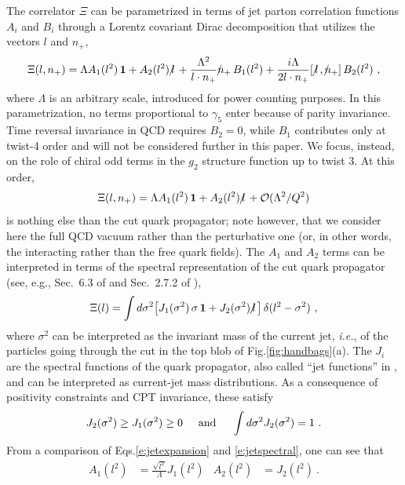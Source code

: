 \documentclass[preprintnumbers,floatfix,nofootinbib]{revtex4}
\newcommand{\lslash}{l \hspace{-0.19cm} / \,}
\newcommand{\nslash}{n \hspace{-0.24cm} / \,}
\newcommand{\id}{{\bm 1}
}
\begin{document}
The correlator $\Xi$ can be parametrized in terms of jet parton correlation
functions $A_i$ and $B_i$ through a Lorentz covariant Dirac decomposition that utilizes the vectors $l$ and $n_+$, 
\begin{equation}
\Xi(l,n_+) = \Lambda A_1(l^2)\,\id + A_2(l^2)\,\lslash 
+ \frac{\Lambda^2}{l \cdot n_{+}} \nslash_+ \, B_{1}(l^2)
+ \frac{i \Lambda}{2 l \cdot n_{+}} [\,\lslash,\nslash_+ ] \, B_{2}(l^2) \ ,
\label{e:jetexpansion}
\end{equation} 
where $\Lambda$ is an arbitrary scale, introduced for power counting purposes.
In this parametrization, no terms proportional to $\gamma_5$ enter because of parity invariance. Time reversal invariance in QCD requires $B_{2}=0$, while $B_{1}$ contributes only at twist-4 order and will not be considered further in this paper. We focus, instead, on the role of chiral odd terms in the $g_2$ structure function up to twist 3. At this order, 
\begin{equation}
  \Xi(l,n_+) = \Lambda A_1(l^2)\,\id + A_2(l^2)\,\lslash 
    + {\cal O}(\Lambda^2/Q^2)
\label{e:jetexpansion-tw3}
\end{equation} 
is nothing else than the cut quark propagator; note however, that we consider
here the full QCD vacuum rather than the perturbative one (or, in other words, the interacting rather than the free quark fields).
The $A_1$ and $A_2$ terms can be interpreted in terms of the spectral
representation of the cut quark propagator (see, e.g., Sec.~6.3 of
\cite{D'Hoker:2004aa} and Sec.~2.7.2 of \cite{Romao:2013aa}),
\begin{align} 
  \Xi(l) =  
  \int d \sigma^2 \big[ J_1 (\sigma^2)\,\sigma\,\id + J_2 (\sigma^2)\,\lslash \big] \,
  \delta(l^2 -\sigma^2) \ ,
\label{e:jetspectral}
\end{align}
where $\sigma^2$ can be interpreted as the invariant mass of the current jet, {\it
  i.e.}, of the particles going through the cut in the top blob of
Fig.\ref{fig:handbags}(a). The $J_i$ are the spectral functions of the
quark propagator, also called ``jet functions'' in
\cite{Accardi:2008ne}, and can be interpreted as current-jet mass distributions. As a consequence of positivity constraints and CPT invariance, these satisfy \cite{D'Hoker:2004aa,Romao:2013aa,Weinberg:1995mt}
\begin{align}
  J_2(\sigma^2) \geq J_1(\sigma^2) \geq 0
  \hspace*{0.5cm} \text{and} \hspace*{0.5cm}
  \int d\sigma^2 J_2(\sigma^2) = 1 \ .
\label{eq:jetfnsprops}
\end{align}
From a comparison of Eqs.\eqref{e:jetexpansion} and \eqref{e:jetspectral}, one can see that 
\begin{align}
  A_1(l^2)&=\frac{\sqrt{l^2}}{\Lambda}J_1(l^2) & A_2(l^2)&=J_2(l^2) \ .
  \label{eq:jet_vs_spectral}
\end{align}
\end{document}
